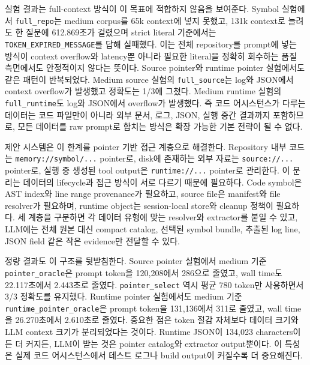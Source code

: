 \documentclass[11pt,a4paper]{article}
\begin{document}
실험 결과는 full-context 방식이 이 목표에 적합하지 않음을 보여준다. Symbol 실험에서 \texttt{full\_repo}는 medium corpus를 65k context에 넣지 못했고, 131k context로 늘려도 한 질문에 612.869초가 걸렸으며 strict literal 기준에서는 \texttt{TOKEN\_EXPIRED\_MESSAGE}를 답해 실패했다. 이는 전체 repository를 prompt에 넣는 방식이 context overflow와 latency뿐 아니라 필요한 literal을 정확히 회수하는 품질 측면에서도 안정적이지 않다는 뜻이다. Source pointer와 runtime pointer 실험에서도 같은 패턴이 반복되었다. Medium source 실험의 \texttt{full\_source}는 log와 JSON에서 context overflow가 발생했고 정확도는 1/3에 그쳤다. Medium runtime 실험의 \texttt{full\_runtime}도 log와 JSON에서 overflow가 발생했다. 즉 코드 어시스턴스가 다루는 데이터는 코드 파일만이 아니라 외부 문서, 로그, JSON, 실행 중간 결과까지 포함하므로, 모든 데이터를 raw prompt로 합치는 방식은 확장 가능한 기본 전략이 될 수 없다.

제안 시스템은 이 한계를 pointer 기반 접근 계층으로 해결한다. Repository 내부 코드는 \texttt{memory://symbol/...} pointer로, disk에 존재하는 외부 자료는 \texttt{source://...} pointer로, 실행 중 생성된 tool output은 \texttt{runtime://...} pointer로 관리한다. 이 분리는 데이터의 lifecycle과 접근 방식이 서로 다르기 때문에 필요하다. Code symbol은 AST index와 line range provenance가 필요하고, source file은 manifest와 file resolver가 필요하며, runtime object는 session-local store와 cleanup 정책이 필요하다. 세 계층을 구분하면 각 데이터 유형에 맞는 resolver와 extractor를 붙일 수 있고, LLM에는 전체 원본 대신 compact catalog, 선택된 symbol bundle, 추출된 log line, JSON field 같은 작은 evidence만 전달할 수 있다.

정량 결과도 이 구조를 뒷받침한다. Source pointer 실험에서 medium 기준 \texttt{pointer\_oracle}은 prompt token을 120,208에서 286으로 줄였고, wall time도 22.117초에서 2.443초로 줄였다. \texttt{pointer\_select} 역시 평균 780 token만 사용하면서 3/3 정확도를 유지했다. Runtime pointer 실험에서도 medium 기준 \texttt{runtime\_pointer\_oracle}은 prompt token을 131,136에서 311로 줄였고, wall time을 26.270초에서 2.610초로 줄였다. 중요한 점은 token 절감 자체보다 데이터 크기와 LLM context 크기가 분리되었다는 것이다. Runtime JSON이 134,023 characters이든 더 커지든, LLM이 받는 것은 pointer catalog와 extractor output뿐이다. 이 특성은 실제 코드 어시스턴스에서 테스트 로그나 build output이 커질수록 더 중요해진다.
\end{document}
